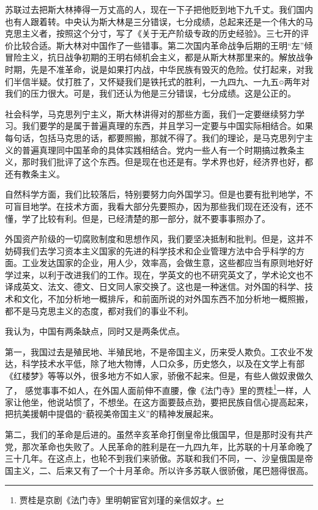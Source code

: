 \documentclass[UTF8, 12pt, a4paper]{ctexrep}
\begin{document}
苏联过去把斯大林捧得一万丈高的人，现在一下子把他贬到地下九千丈。我们国内也有人跟着转。中央认为斯大林是三分错误，七分成绩，总起来还是一个伟大的马克思主义者，按照这个分寸，写了《关于无产阶级专政的历史经验》。三七开的评价比较合适。斯大林对中国作了一些错事。第二次国内革命战争后期的王明“左”倾冒险主义，抗日战争初期的王明右倾机会主义，都是从斯大林那里来的。解放战争时期，先是不准革命，说是如果打内战，中华民族有毁灭的危险。仗打起来，对我们半信半疑。仗打胜了，又怀疑我们是铁托式的胜利，一九四九、一九五○两年对我们的压力很大。可是，我们还认为他是三分错误，七分成绩。这是公正的。

社会科学，马克思列宁主义，斯大林讲得对的那些方面，我们一定要继续努力学习。我们要学的是属于普遍真理的东西，并且学习一定要与中国实际相结合。如果每句话，包括马克思的话，都要照搬，那就不得了。我们的理论，是马克思列宁主义的普遍真理同中国革命的具体实践相结合。党内一些人有一个时期搞过教条主义，那时我们批评了这个东西。但是现在也还是有。学术界也好，经济界也好，都还有教条主义。

自然科学方面，我们比较落后，特别要努力向外国学习。但是也要有批判地学，不可盲目地学。在技术方面，我看大部分先要照办，因为那些我们现在还没有，还不懂，学了比较有利。但是，已经清楚的那一部分，就不要事事照办了。

外国资产阶级的一切腐败制度和思想作风，我们要坚决抵制和批判。但是，这并不妨碍我们去学习资本主义国家的先进的科学技术和企业管理方法中合乎科学的方面。工业发达国家的企业，用人少，效率高，会做生意，这些都应当有原则地好好学过来，以利于改进我们的工作。现在，学英文的也不研究英文了，学术论文也不译成英文、法文、德文、日文同人家交换了。这也是一种迷信。对外国的科学、技术和文化，不加分析地一概排斥，和前面所说的对外国东西不加分析地一概照搬，都不是马克思主义的态度，都对我们的事业不利。

我认为，中国有两条缺点，同时又是两条优点。

第一，我国过去是殖民地、半殖民地，不是帝国主义，历来受人欺负。工农业不发达，科学技术水平低，除了地大物博，人口众多，历史悠久，以及在文学上有部《红楼梦》等等以外，很多地方不如人家，骄傲不起来。但是，有些人做奴隶做久了， 感觉事事不如人，在外国人面前伸不直腰，像《法门寺》里的贾桂\footnote{贾桂是京剧《法门寺》里明朝宦官刘瑾的亲信奴才。}一样，人家让他坐，他说站惯了，不想坐。在这方面要鼓点劲，要把民族自信心提高起来，把抗美援朝中提倡的“藐视美帝国主义”的精神发展起来。

第二，我们的革命是后进的。虽然辛亥革命打倒皇帝比俄国早，但是那时没有共产党，那次革命也失败了。人民革命的胜利是在一九四九年，比苏联的十月革命晚了三十几年。在这点上，也轮不到我们来骄傲。苏联和我们不同，一、沙皇俄国是帝国主义，二、后来又有了一个十月革命。所以许多苏联人很骄傲，尾巴翘得很高。
\end{document}
